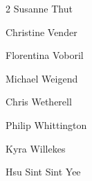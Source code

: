 \begin{multicols}{2}
   \ifdefined\AuthorThutSusanne {}  Susanne Thut\fi

   \ifdefined\AuthorVenderChristine {} Christine Vender\fi

   \ifdefined\AuthorVoborilFlorentina {} Florentina Voboril\fi

   \ifdefined\AuthorWeigendMichael {} Michael Weigend\fi

   \ifdefined\AuthorWetherellChris {} Chris Wetherell\fi

   \ifdefined\AuthorWhittingtonPhilip {} Philip Whittington\fi

   \ifdefined\AuthorWillekesKyra {} Kyra Willekes\fi

   \ifdefined\AuthorYeeSintSintHsu {} Hsu Sint Sint Yee\fi
   
\end{multicols}